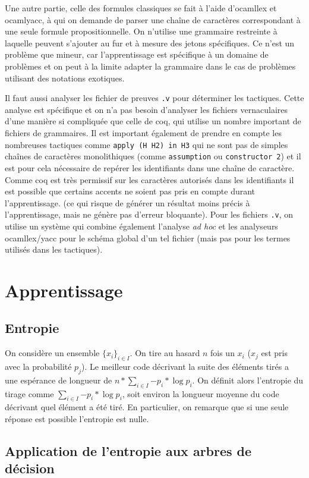   Une autre partie, celle des formules classiques se fait à l'aide d'ocamllex et ocamlyacc, à qui on demande de parser une chaîne de caractères correspondant à une seule formule propositionnelle. On n'utilise une grammaire restreinte à laquelle peuvent s'ajouter au fur et à mesure des jetons spécifiques. Ce n'est un problème que mineur, car l'apprentissage est spécifique à un domaine de problèmes et on peut à la limite adapter la grammaire dans le cas de problèmes utilisant des notations exotiques.

  Il faut aussi analyser les fichier de preuves {\tt .v} pour déterminer les tactiques. Cette analyse est spécifique et on n'a pas besoin d'analyser les fichiers vernaculaires d'une manière si compliquée que celle de coq, qui utilise un nombre important de fichiers de grammaires. Il est important également de prendre en compte les nombreuses tactiques comme {\tt apply (H H2) in H3} qui ne sont pas de simples chaînes de caractères monolithiques (comme {\tt assumption} ou {\tt constructor 2}) et il est pour cela nécessaire de repérer les identifiants dans une chaîne de caractère. Comme coq est très permissif sur les caractères autorisés dans les identifiants il est possible que certains accents ne soient pas pris en compte durant l'apprentissage. (ce qui risque de générer un résultat moins précis à l'apprentissage, mais ne génère pas d'erreur bloquante). Pour les fichiers {\tt .v}, on utilise un système qui combine également l'analyse \textit{ad hoc} et les analyseurs ocamllex/yacc pour le schéma global d'un tel fichier (mais pas pour les termes utilisés dans les tactiques).

\section{Apprentissage}
\subsection*{Entropie}
On considère un ensemble $\{x_i\}_{i \in I}$. On tire au hasard $n$ fois un $x_i$ ($x_j$ est pris avec la probabilité $p_j$). Le meilleur code décrivant la suite des éléments tirés a une espérance de longueur de $n * \sum_{i \in I}{- p_i * \log{p_i}}$. On définit alors l'entropie du tirage comme $ \sum_{i \in I}{- p_i * \log{p_i}}$, soit environ la longueur moyenne du code décrivant quel élément a été tiré. En particulier, on remarque que si une seule réponse est possible l'entropie est nulle.

\subsection*{Application de l'entropie aux arbres de décision}
